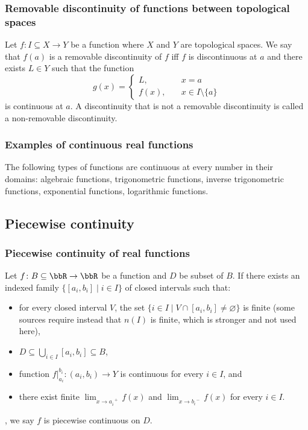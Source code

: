 \documentclass[a4paper,12pt]{report}
\begin{document}
\begin{itemize}
\begin{itemize}
\subsubsection{Removable discontinuity of functions between topological spaces}
Let $f\colon I\subseteq X\to Y$ be a function where $X$ and $Y$ are topological spaces. We say that $f(a)$ is a removable discontinuity of $f$ iff $f$ is discontinuous at $a$ and there exists $L\in Y$ such that the function
\[g(x)=\begin{cases}L,\quad&x=a\\f(x),\quad&x\in I\setminus\{a\}\end{cases}\]
is continuous at $a$. A discontinuity that is not a removable discontinuity is called a non-removable discontinuity.
\subsubsection{Examples of continuous real functions}
The following types of functions are continuous at every number in their domains: algebraic functions, trigonometric functions, inverse trigonometric functions, exponential functions, logarithmic functions.
\subsection{Piecewise continuity}
\subsubsection{Piecewise continuity of real functions}
Let $f\colon B\subseteq\bbR\to\bbR$ be a function and $D$ be subset of $B$. If there exists an indexed family $\{[a_i,b_i]\mid i\in I\}$ of closed intervals such that:
\begin{itemize}
\item for every closed interval $V$, the set $\{i\in I\mid V\cap [a_i,b_i]\neq\varnothing\}$ is finite (some sources require instead that $n(I)$ is finite, which is stronger and not used here),
\item $D\subseteq\bigcup_{i\in I}[a_i,b_i]\subseteq B$,
\item function $f\big\vert_{a_i}^{b_i}\colon(a_i,b_i)\to Y$ is continuous for every $i\in I$, and
\item there exist finite $\lim_{x\to a_i^{\phantom{i}+}}f(x)$ and $\lim_{x\to b_i^{\phantom{i}-}}f(x)$ for every $i\in I$.
\end{itemize},
we say $f$ is piecewise continuous on $D$.


\end{itemize}
\end{itemize}
\end{document}
